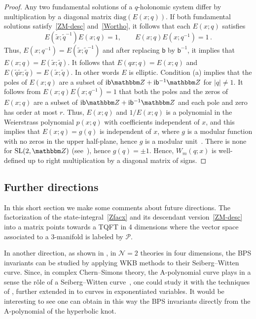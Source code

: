 \documentclass[12pt,reqno]{amsart}
\theoremstyle{definition}
\def\BZ{\mathbbm Z}
\def\calP{\mathcal P}
\def\SL{\mathrm{SL}}
\def\tq{\tilde{q}}
\def\tx{\tilde{x}}
\def\bb{\mathsf{b}}
\def\ri{\mathrm{i}}
\def\tx{\tilde{x}}
\def\ri{{\rm i}}
\def\diag{\mathrm{diag}}
\begin{document}
\begin{proof}
  Any two fundamental solutions of a $q$-holonomic system differ by
  multiplication by a diagonal matrix $\diag(E(x;q))$. If both
  fundamental solutions satisfy~\eqref{ZM-desc} and~\eqref{Wortho}, it
  follows that each $E(x;q)$ satisfies
\begin{equation}
  \label{EE}
  E(\tx;\tq^{-1}) E(x;q) =1 , \qquad E(x;q)E(x;q^{-1})=1 \,.
\end{equation}
Thus, $E(x;q^{-1})=E(\tx;\tq^{-1})$ and after replacing $\bb$ by $\bb^{-1}$,
it implies that $E(x;q)=E(\tx;\tq)$.
It follows that $E(qx;q)=E(x;q)$ and $E(\tq \tx;\tq)=E(\tx;\tq)$.  In
other words $E$ is elliptic. Condition (a) implies that the poles of
$E(x;q)$ are a subset of $\ri \bb \BZ + \ri \bb^{-1} \BZ$ for $|q| \neq 1$.
It follows from $E(x;q) E(x;q^{-1})=1$ that both the poles and the zeros
of $E(x;q)$ are a subset of $\ri \bb \BZ + \ri \bb^{-1} \BZ$ and each
pole and zero has order at most $r$. Thus, $E(x;q)$ and $1/E(x;q)$ is a
polynomial in the Weierstrass polynomial $p(x;q)$ with coefficients
independent of $x$, and this implies that $E(x;q)=g(q)$ is independent of $x$,
where $g$ is a modular function with no zeros in the upper half-plane,
hence $g$ is a modular unit~\cite{Kubert-Lang}. There is none for $\SL(2,\BZ)$
(see~\cite{Kubert-Lang}), hence $g(q) = \pm 1$. Hence, $W_m(q;x)$ is
well-defined up to right multiplication by a diagonal matrix of signs. 
\end{proof}

\subsection{Further directions}
\label{sub.problems}

In this short section we make some comments about future directions. 
The factorization of the state-integral~\eqref{Zfacx} and its
descendant version~\eqref{ZM-desc} into a matrix points towards a
TQFT in 4 dimensions where the vector space associated to a 3-manifold is
labeled by $\calP$.

In another direction, 
as shown in \cite{klmvw,gmn2}, in $\mathcal{N}=2$ theories in four
dimensions, the BPS invariants can be studied by applying WKB methods
to their Seiberg--Witten curve. Since, in complex Chern--Simons
theory, the A-polynomial curve plays in a sense the r\^ole of a
Seiberg--Witten curve~\cite{gukov}, one could study it with the
techniques of \cite{klmvw,gmn2}, further extended in
\cite{esw,blm1,blm2} to curves in exponentiated variables.  It would
be interesting to see one can obtain in this way the BPS invariants
directly from the A-polynomial of the hyperbolic knot.
\end{document}
